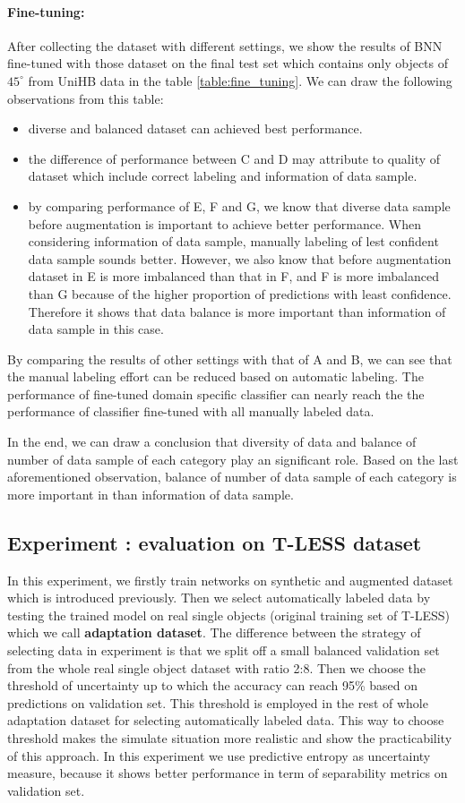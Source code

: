 \paragraph{Fine-tuning:} After collecting the dataset with different settings, we show the results of BNN fine-tuned with those dataset on the final test set which contains only objects of $45^{\circ}$ from UniHB data in the table \ref{table:fine_tuning}. We can draw the following observations from this table:
\begin{itemize}
	\item diverse and balanced dataset can achieved best performance.
	\item the difference of performance between C and D may attribute to quality of dataset which include correct labeling and information of data sample.
	\item by comparing performance of E, F and G, we know that diverse data sample before augmentation is important to achieve better performance. When considering information of data sample, manually labeling of lest confident data sample sounds better. However, we also know that before augmentation dataset in E is more imbalanced than that in F, and F is more imbalanced than G because of the higher proportion of predictions with least confidence. Therefore it shows that data balance is more important than information of data sample in this case.
\end{itemize}
By comparing the results of other settings with that of A and B, we can see that the manual labeling effort can be reduced based on automatic labeling.  The performance of fine-tuned domain specific classifier can nearly reach the the performance of classifier fine-tuned with all manually labeled data. 

In the end, we can draw a conclusion that diversity of data and balance of number of data sample of each category play an significant role. Based on the last aforementioned observation, balance of number of data sample of each category is more important in than information of data sample.

\subsection{Experiment : evaluation on T-LESS dataset}
In this experiment, we firstly train networks on synthetic and augmented dataset which is introduced previously. Then we select automatically labeled data by testing the trained model on real single objects (original training set of T-LESS) which we call \textbf{adaptation dataset}. The difference between the strategy of selecting data in experiment  is that we split off a small balanced validation set from the whole real single object dataset with ratio 2:8. Then we choose the threshold of uncertainty up to which the accuracy can reach 95\% based on predictions on validation set. This threshold is employed in the rest of whole adaptation dataset for selecting automatically labeled data. This way to choose threshold makes the simulate situation more realistic and show the practicability of this approach. In this experiment we use predictive entropy as uncertainty measure, because it shows better performance in term of separability metrics on validation set.

